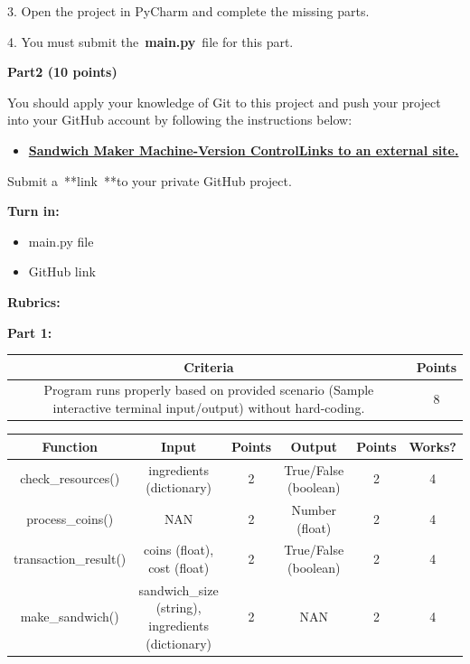 \documentclass[
]{article}
\providecommand{\tightlist}{%
  \setlength{\itemsep}{0pt}\setlength{\parskip}{0pt}}
\begin{document}
3. Open the project in PyCharm and complete the missing parts.

4. You must submit the~\textbf{main.py}~file for this part.

\textbf{Part2 (10 points)}

You should apply your knowledge of Git to this project and push your
project into your GitHub account by following the instructions below:

\begin{itemize}
\tightlist
\item
  \href{https://docs.google.com/document/d/1DahT-ZiFTmzyIGTBtEwgMe0WFDMs5ydjbg0b-U2yRfs/edit}{\textbf{Sandwich
  Maker Machine-Version ControlLinks to an external site.}}
\end{itemize}

Submit a~**link~**to your private GitHub project.

\textbf{Turn in:}

\begin{itemize}
\tightlist
\item
  main.py file
\item
  GitHub link
\end{itemize}

\textbf{Rubrics:}

\textbf{Part 1:}

\begin{longtable}[]{@{}cc@{}}
\toprule\noalign{}
Criteria & Points \\
\midrule\noalign{}
\endhead
\bottomrule\noalign{}
\endlastfoot
Program runs properly based on provided scenario (Sample interactive
terminal input/output) without hard-coding. & 8 \\
\end{longtable}

\begin{longtable}[]{@{}cccccc@{}}
\toprule\noalign{}
Function & Input & Points & Output & Points & Works? \\
\midrule\noalign{}
\endhead
\bottomrule\noalign{}
\endlastfoot
check\_resources() & ingredients (dictionary) & 2 & True/False (boolean)
& 2 & 4 \\
process\_coins() & NAN & 2 & Number (float) & 2 & 4 \\
transaction\_result() & coins (float), cost (float) & 2 & True/False
(boolean) & 2 & 4 \\
make\_sandwich() & sandwich\_size (string), ingredients (dictionary) & 2
& NAN & 2 & 4 \\
\end{longtable}
\end{document}
